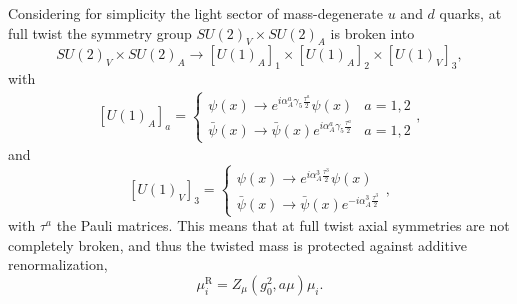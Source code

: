 Considering for simplicity the light sector of mass-degenerate $u$ and $d$ quarks, at full twist the symmetry group $SU(2)_V\times SU(2)_A$ is broken into
\begin{equation}
SU(2)_V\times SU(2)_A\rightarrow[U(1)_A]_1\times[U(1)_A]_2\times[U(1)_V]_3,
\end{equation}
with 
\begin{align}
\left[U(1)_A\right]_a=\left\{\begin{matrix}
\psi(x)\rightarrow e^{i\alpha_A^a\gamma_5\frac{\tau^a}{2}}\psi(x) & a=1,2 \\ 
\bar{\psi}(x)\rightarrow \bar{\psi}(x)e^{i\alpha_A^a\gamma_5\frac{\tau^a}{2}} & a=1,2
\end{matrix}\right.,
\end{align}
and
\begin{equation}
\left[U(1)_V\right]_3=\left\{\begin{matrix}
\psi(x)\rightarrow e^{i\alpha_A^3\frac{\tau^3}{2}}\psi(x) \\ 
\bar{\psi}(x)\rightarrow \bar{\psi}(x)e^{-i\alpha_A^3\frac{\tau^3}{2}}
\end{matrix}\right.,
\end{equation}
with $\tau^{a}$ the Pauli matrices. This means that at full twist axial symmetries are not completely broken, and thus the twisted mass is protected against additive renormalization,
\begin{equation}
\label{ch_foundation:eq:muR}
\mu_i^{\textrm{R}}=Z_{\mu}(g_0^2,a\mu)\mu_i.
\end{equation}

